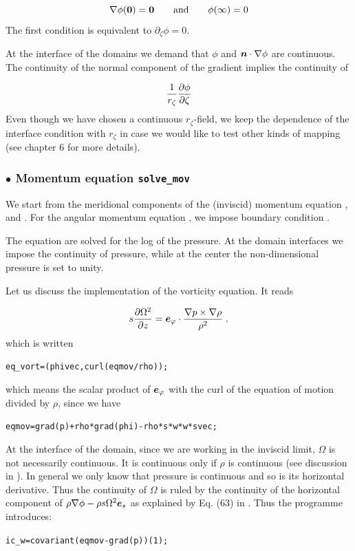 \[ \na\phi(\vzero) = \vzero  \andet \phi(\infty) = 0\]
The first condition is equivalent to $\partial_\zeta\phi=0$.

At the interface of the domains we demand that $\phi$ and $\vn\cdot\na\phi$
are continuous. The continuity of the normal component of the gradient implies
the continuity of

\[ \frac{1}{r_\zeta}\frac{\partial \phi}{\partial \zeta}\]
Even though we have chosen a continuous $r_\zeta$-field, we keep the
dependence of the interface condition with $r_\zeta$ in case we would like to
test other kinds of mapping (see chapter 6 for more details).

\subsubsection{$\bullet$ \bf Momentum equation {\tt solve\_mov}}

We start from the meridional components of the (inviscid) momentum equation
,  and . For the angular momentum
equation , we impose boundary condition .

The equation are solved for the log of the pressure. At the domain
interfaces we impose the continuity of pressure, while at the center the
non-dimensional pressure is set to unity.

Let us discuss the implementation of the vorticity equation. It reads

\[ s\frac{\partial\Omega^2}{\partial z}=\ephi\cdot\frac{\na
p\times\na\rho}{\rho^2} \;.
\]
which is written

\centerline{\tt eq\_vort=(phivec,curl(eqmov/rho));}
\bigskip
\noindent which means the scalar product of $\ephi$ with the curl of
the equation of motion divided by $\rho$, since we have

\bigskip
\centerline{\tt eqmov=grad(p)+rho*grad(phi)-rho*s*w*w*svec;}
\bigskip

At the interface of the domain, since we are working in the inviscid
limit, $\Omega$ is not necessarily continuous. It is continuous only if
$\rho$ is continuous (see discussion in \citealt{ELR13}). In general we
only know that pressure is continuous and so is its horizontal
derivative. Thus the continuity of $\Omega$ is ruled by the continuity
of the horizontal component of $\rho\na\phi-\rho s\Omega^2\es$ as
explained by Eq. (63) in \cite{ELR13}. Thus the programme introduces:

\bigskip
\centerline{\tt ic\_w=covariant(eqmov-grad(p))(1);
}
\bigskip

